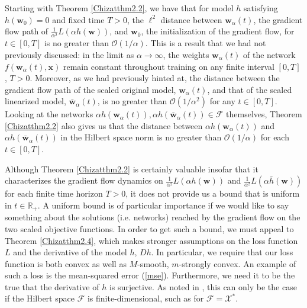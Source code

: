 \documentclass{article}
\begin{document}
Starting with Theorem \ref{Chizatthm2.2}, we have that for model $h$ satisfying $h(\boldsymbol{w}_0) = 0$ and fixed time $T > 0$, the $\ell^2$ distance between $\boldsymbol{w}_{\alpha}(t)$, the gradient flow path of $\frac{1}{\alpha^2} L(\alpha h(\boldsymbol{w}))$, and $\boldsymbol{w}_0$, the initialization of the gradient flow, for $t \in [0, T]$ is no greater than $\mathcal{O}(1/\alpha)$. This is a result that we had not previously discussed: in the limit as $\alpha \rightarrow \infty$, the weights $\boldsymbol{w}_{\alpha}(t)$ of the network $f(\boldsymbol{w}_{\alpha}(t), \boldsymbol{x})$ remain constant throughout training on any finite interval $[0, T]$, $T > 0$. Moreover, as we had previously hinted at, the distance between the gradient flow path of the scaled original model, $\boldsymbol{w}_{\alpha}(t)$, and that of the scaled linearized model, $\boldsymbol{\bar{w}}_{\alpha}(t)$, is no greater than $\mathcal{O}(1/\alpha^2)$ for any $t \in [0, T]$. Looking at the networks $\alpha h(\boldsymbol{w}_{\alpha}(t)), \alpha h(\boldsymbol{\bar{w}}_{\alpha}(t)) \in \mathcal{F}$ themselves, Theorem \ref{Chizatthm2.2} also gives us that the distance between $\alpha h(\boldsymbol{w}_{\alpha}(t))$ and $\alpha h(\boldsymbol{\bar{w}}_{\alpha}(t))$ in the Hilbert space norm is no greater than $\mathcal{O}(1/\alpha)$ for each $t \in [0, T]$.

Although Theorem \ref{Chizatthm2.2} is certainly valuable insofar that it characterizes the gradient flow dynamics on $\frac{1}{\alpha^2}L(\alpha h(\boldsymbol{w}))$ and $\frac{1}{\alpha^2}L(\alpha \bar{h}(\boldsymbol{w}))$ for each finite time horizon $T > 0$, it does not provide us a bound that is uniform in $t \in \mathbb{R}_+$. A uniform bound is of particular importance if we would like to say something about the solutions (i.e. networks) reached by the gradient flow on the two scaled objective functions. In order to get such a bound, we must appeal to Theorem \ref{Chizatthm2.4}, which makes stronger assumptions on the loss function $L$ and the derivative of the model $h$, $Dh$. In particular, we require that our loss function is both convex as well as $M$-smooth, $m$-strongly convex. An example of such a loss is the mean-squared error (\ref{mse}). Furthermore, we need it to be the true that the derivative of $h$ is surjective. As noted in \cite{chizat2018lazy}, this can only be the case if the Hilbert space $\mathcal{F}$ is finite-dimensional, such as for $\mathcal{F} = \mathcal{X}^*$.
\end{document}
